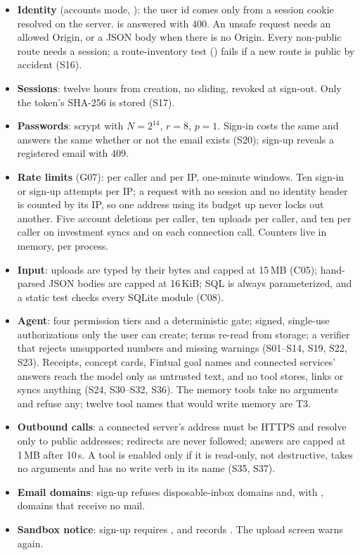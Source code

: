 \documentclass[11pt,a4paper]{article}
\begin{document}
\begin{itemize}
  \item \textbf{Identity} (accounts mode, ): the user id comes only from a session
    cookie resolved on the server.  is answered with 400. An unsafe request needs an allowed Origin, or a
    JSON body when there is no Origin. Every non-public route needs a session; a route-inventory test
    () fails if a new route is public by accident (S16).
  \item \textbf{Sessions}: twelve hours from creation, no sliding, revoked at sign-out. Only the token's SHA-256 is
    stored (S17).
  \item \textbf{Passwords}: scrypt with $N = 2^{14}$, $r = 8$, $p = 1$. Sign-in costs the same and answers the same
    whether or not the email exists (S20); sign-up reveals a registered email with 409.
  \item \textbf{Rate limits} (G07): per caller and per IP, one-minute windows. Ten sign-in or sign-up attempts per IP;
    a request with no session and no identity header is counted by its IP, so one address using its budget up never
    locks out another. Five account deletions per caller, ten uploads per caller, and ten per caller on investment syncs and on each connection call.
    Counters live in memory, per process.
  \item \textbf{Input}: uploads are typed by their bytes and capped at 15\,MB (C05); hand-parsed JSON bodies are capped at
    16\,KiB; SQL is always parameterized, and a static test checks every SQLite module (C08).
  \item \textbf{Agent}: four permission tiers and a deterministic gate; signed, single-use authorizations only the user
    can create; terms re-read from storage; a verifier that rejects unsupported numbers and missing warnings
    (S01--S14, S19, S22, S23). Receipts, concept cards, Fintual goal names and connected services' answers reach the
    model only as untrusted text, and no tool stores, links or syncs anything (S24, S30--S32, S36). The memory tools take no arguments and refuse any;
    twelve tool names that would write memory are T3.
  \item \textbf{Outbound calls}: a connected server's address must be HTTPS and resolve only to public addresses;
    redirects are never followed; answers are capped at 1\,MB after 10\,s. A tool is enabled only if it is read-only,
    not destructive, takes no arguments and has no write verb in its name (S35, S37).
  \item \textbf{Email domains}: sign-up refuses disposable-inbox domains and, with , domains that receive no
    mail.
  \item \textbf{Sandbox notice}: sign-up requires , and  records
    . The upload screen warns again.
\end{itemize}
\end{document}
